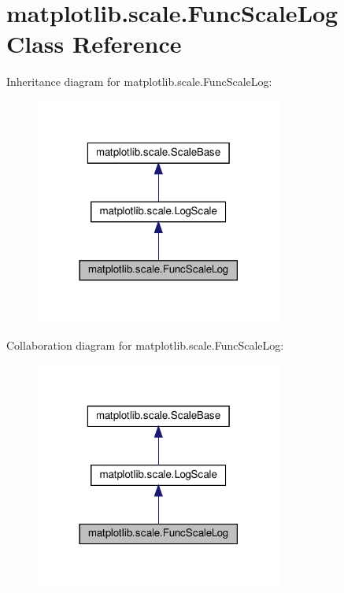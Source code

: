 \hypertarget{classmatplotlib_1_1scale_1_1FuncScaleLog}{}\section{matplotlib.\+scale.\+Func\+Scale\+Log Class Reference}
\label{classmatplotlib_1_1scale_1_1FuncScaleLog}


Inheritance diagram for matplotlib.\+scale.\+Func\+Scale\+Log\+:
\nopagebreak
\begin{figure}[H]
\begin{center}
\leavevmode
\includegraphics[width=230pt]{classmatplotlib_1_1scale_1_1FuncScaleLog__inherit__graph}
\end{center}
\end{figure}


Collaboration diagram for matplotlib.\+scale.\+Func\+Scale\+Log\+:
\nopagebreak
\begin{figure}[H]
\begin{center}
\leavevmode
\includegraphics[width=230pt]{classmatplotlib_1_1scale_1_1FuncScaleLog__coll__graph}
\end{center}
\end{figure}
